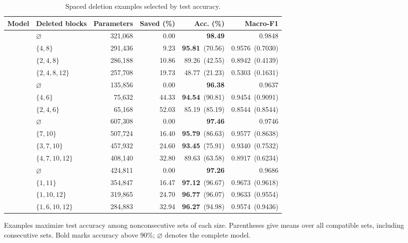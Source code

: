 \begin{table}[htbp]
\caption{Spaced deletion examples selected by test accuracy.}
\label{tab:spaced_deletion}
\centering\small
\setlength{\tabcolsep}{3pt}
\begin{tabular*}{\linewidth}{@{\extracolsep{\fill}}llrrrr@{}}
\toprule
Model & Deleted blocks & Parameters & Saved (\%) & Acc. (\%) & Macro-F1 \\
\midrule
{} & $\varnothing$ & 321,068 & 0.00 & \textbf{98.49} & 0.9848 \\
 & $\{4,8\}$ & 291,436 & 9.23 & \textbf{95.81}~(70.56) & 0.9576~(0.7030) \\
 & $\{2,4,8\}$ & 286,188 & 10.86 & 89.26~(42.55) & 0.8942~(0.4139) \\
 & $\{2,4,8,12\}$ & 257,708 & 19.73 & 48.77~(21.23) & 0.5303~(0.1631) \\
\midrule
{} & $\varnothing$ & 135,856 & 0.00 & \textbf{96.38} & 0.9637 \\
 & $\{4,6\}$ & 75,632 & 44.33 & \textbf{94.54}~(90.81) & 0.9454~(0.9091) \\
 & $\{2,4,6\}$ & 65,168 & 52.03 & 85.19~(85.19) & 0.8544~(0.8544) \\
\midrule
{} & $\varnothing$ & 607,308 & 0.00 & \textbf{97.46} & 0.9746 \\
 & $\{7,10\}$ & 507,724 & 16.40 & \textbf{95.79}~(86.63) & 0.9577~(0.8638) \\
 & $\{3,7,10\}$ & 457,932 & 24.60 & \textbf{93.45}~(75.91) & 0.9340~(0.7532) \\
 & $\{4,7,10,12\}$ & 408,140 & 32.80 & 89.63~(63.58) & 0.8917~(0.6234) \\
\midrule
{} & $\varnothing$ & 424,811 & 0.00 & \textbf{97.26} & 0.9686 \\
 & $\{1,11\}$ & 354,847 & 16.47 & \textbf{97.12}~(96.67) & 0.9673~(0.9618) \\
 & $\{1,10,12\}$ & 319,865 & 24.70 & \textbf{96.77}~(96.07) & 0.9633~(0.9554) \\
 & $\{1,6,10,12\}$ & 284,883 & 32.94 & \textbf{96.27}~(94.98) & 0.9574~(0.9436) \\
\bottomrule
\end{tabular*}
\par\smallskip\begin{minipage}{\linewidth}\footnotesize
Examples maximize test accuracy among nonconsecutive sets of each size. Parentheses give means over all compatible sets, including consecutive sets. Bold marks accuracy above 90\%; $\varnothing$ denotes the complete model.
\end{minipage}
\end{table}
